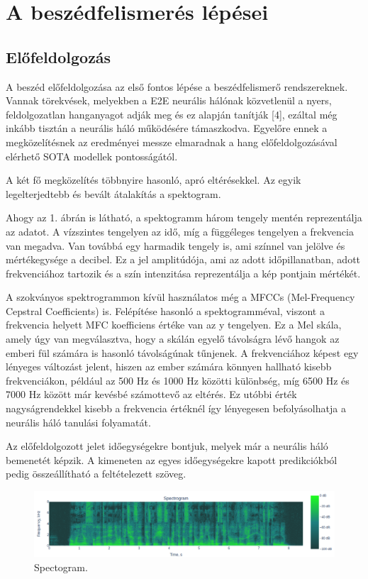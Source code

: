 \section{A beszédfelismerés lépései}

\subsection{Előfeldolgozás}

A beszéd előfeldolgozása az első fontos lépése a beszédfelismerő rendszereknek. Vannak törekvések, melyekben a E2E neurális hálónak közvetlenül a nyers, feldolgozatlan hanganyagot adják meg és ez alapján tanítják [4], ezáltal még inkább tisztán a neurális háló működésére támaszkodva. Egyelőre ennek a megközelítésnek az eredményei messze elmaradnak a hang előfeldolgozásával elérhető SOTA modellek pontosságától.

A két fő megközelítés többnyire hasonló, apró eltérésekkel. Az egyik legelterjedtebb és bevált átalakítás a spektogram.

Ahogy az 1. ábrán is látható, a spektogramm három tengely mentén reprezentálja az adatot. A vízszintes tengelyen az idő, míg a függéleges tengelyen a frekvencia van megadva. Van továbbá egy harmadik tengely is, ami színnel van jelölve és mértékegysége a decibel. Ez a jel amplitúdója, ami az adott időpillanatban, adott frekvenciához tartozik és a szín intenzitása reprezentálja a kép pontjain mértékét.

A szokványos spektrogrammon kívül használatos még a MFCCs (Mel-Frequency Cepstral Coefficients) is. Felépítése hasonló a spektogramméval, viszont a frekvencia helyett MFC koefficiens \cite {mfcc} értéke van az y tengelyen. Ez a Mel skála, amely úgy van megválasztva, hogy a skálán egyelő távolságra lévő hangok az emberi fül számára is hasonló távolságúnak tűnjenek. A frekvenciához képest egy lényeges változást jelent, hiszen az ember számára könnyen hallható kisebb frekvenciákon, például az 500 Hz és 1000 Hz közötti különbség, míg 6500 Hz és 7000 Hz között már kevésbé számottevő az eltérés. Ez utóbbi érték nagyságrendekkel kisebb a frekvencia értéknél így lényegesen befolyásolhatja a neurális háló tanulási folyamatát.

Az előfeldolgozott jelet időegységekre bontjuk, melyek már a neurális háló bemenetét képzik. A kimeneten az egyes időegységekre kapott predikciókból pedig összeállítható a feltételezett szöveg.

\begin{figure}[!ht]
\centering
\includegraphics[width=150mm, keepaspectratio]{figures/spectogram.png}
\caption{Spectogram.}
\label{fig:TeXstudio}
\end{figure}

